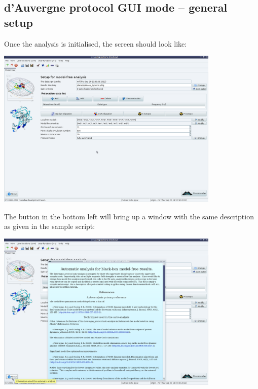 \begin{htmlonly}
\begin{htmlonly}

\subsection{d'Auvergne protocol GUI mode -- general setup}

Once the analysis is initialised, the screen should look like:

\begin{minipage}[h]{\linewidth}
\centerline{\includegraphics[width=0.8\textwidth, bb=14 14 1415 1019]{graphics/screenshots/mf_analysis/blank}}
\end{minipage}

The  button in the bottom left will bring up a window with the same description as given in the sample script:

\begin{minipage}[h]{\linewidth}
\centerline{\includegraphics[width=0.8\textwidth, bb=14 14 1415 1019]{graphics/screenshots/mf_analysis/about}}
\end{minipage}


\end{htmlonly}
\end{htmlonly}
